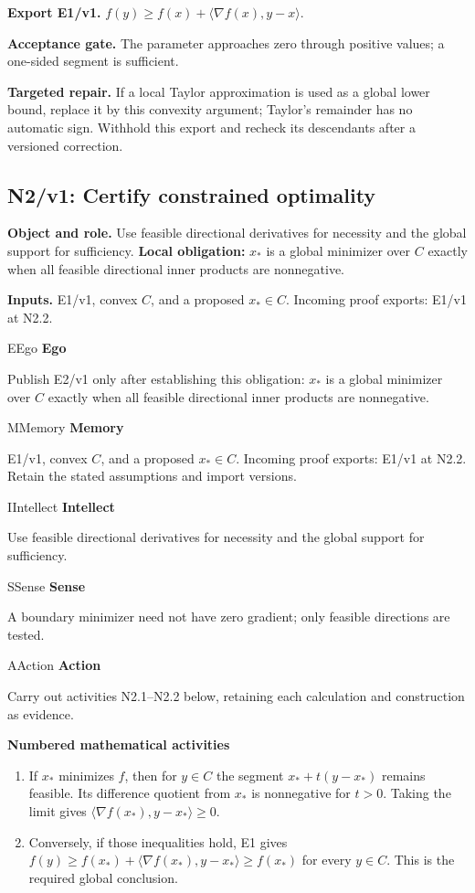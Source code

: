 \documentclass[preprint,12pt,aps,pra,showkeys,amsmath,amssymb,superscriptaddress,floatfix]{revtex4-2}
\theoremstyle{definition}
\theoremstyle{remark}
\newcommand{\mmfaculty}[3]{%
 \begin{mmfacultybox}{#1}{#2}
 {\sffamily\bfseries\color{MMBlue}#2}\par\smallskip #3
 \end{mmfacultybox}}
\newcommand{\field}[2]{\par\smallskip\noindent\textbf{#1.} #2\par}
\begin{document}
\field{Export E1/v1}{\(f(y)\ge f(x)+\langle\nabla f(x),y-x\rangle\).}

\field{Acceptance gate}{The parameter approaches zero through positive values; a one-sided
segment is sufficient.}

\field{Targeted repair}{If a local Taylor approximation is used as a global lower bound, replace
it by this convexity argument; Taylor's remainder has no automatic sign.
Withhold this export and recheck its descendants after a versioned
correction.}

\clearpage

\subsection{N2/v1: Certify constrained optimality}

\field{Object and role}{Use feasible directional derivatives for necessity and the global
support for sufficiency. \textbf{Local obligation:} \(x_*\) is a global
minimizer over \(C\) exactly when all feasible directional inner
products are nonnegative.}

\field{Inputs}{E1/v1, convex \(C\), and a proposed \(x_*\in C\). Incoming proof
exports: E1/v1 at N2.2.}

\mmfaculty{E}{Ego}{Publish E2/v1 only after establishing this obligation: \(x_*\) is a
global minimizer over \(C\) exactly when all feasible directional inner
products are nonnegative.}

\mmfaculty{M}{Memory}{E1/v1, convex \(C\), and a proposed \(x_*\in C\). Incoming proof
exports: E1/v1 at N2.2. Retain the stated assumptions and import
versions.}

\mmfaculty{I}{Intellect}{Use feasible directional derivatives for necessity and the global
support for sufficiency.}

\mmfaculty{S}{Sense}{A boundary minimizer need not have zero gradient; only feasible
directions are tested.}

\mmfaculty{A}{Action}{Carry out activities N2.1--N2.2 below, retaining each calculation and
construction as evidence.}

\smallskip\noindent\textbf{Numbered mathematical activities}

\begin{enumerate}[label=N2.\arabic*,leftmargin=3.4em]

\item If \(x_*\) minimizes \(f\), then for \(y\in C\) the segment
\(x_*+t(y-x_*)\) remains feasible. Its difference quotient from \(x_*\)
is nonnegative for \(t>0\). Taking the limit gives
\(\langle\nabla f(x_*),y-x_*\rangle\ge0\).

\item Conversely, if those inequalities hold, E1 gives
\(f(y)\ge f(x_*)+\langle\nabla f(x_*),y-x_*\rangle\ge f(x_*)\) for every
\(y\in C\). This is the required global conclusion.

\end{enumerate}
\end{document}
